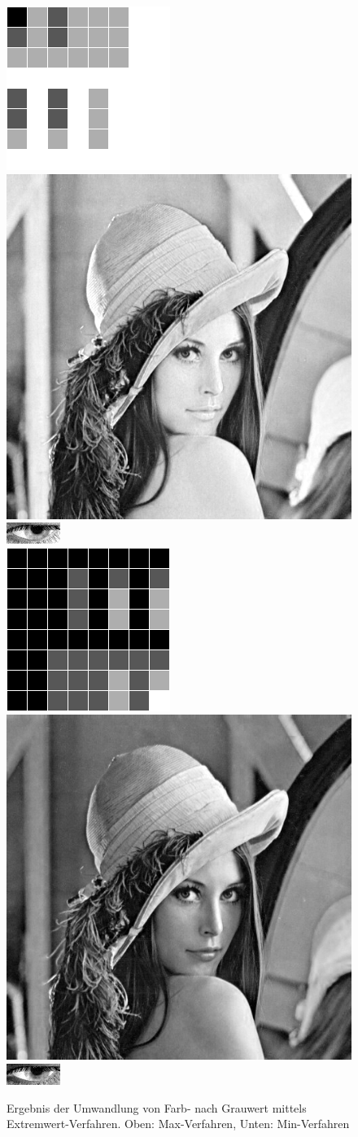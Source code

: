 \begin{figure}
	\centering
	\includegraphics[width=0.21\linewidth]{img/Farbkarte5}
	\includegraphics[width=0.21\linewidth]{img/Lena5}
	\includegraphics[width=0.21\linewidth]{img/Auge_5Gray}\\
	\includegraphics[width=0.21\linewidth]{img/Farbkarte4}
	\includegraphics[width=0.21\linewidth]{img/Lena4}
	\includegraphics[width=0.21\linewidth]{img/Auge_4Gray}
	\caption{Ergebnis der Umwandlung von Farb- nach Grauwert mittels Extremwert-Verfahren. Oben: Max-Verfahren, Unten: Min-Verfahren}
	\label{img_MinMax}
\end{figure}
